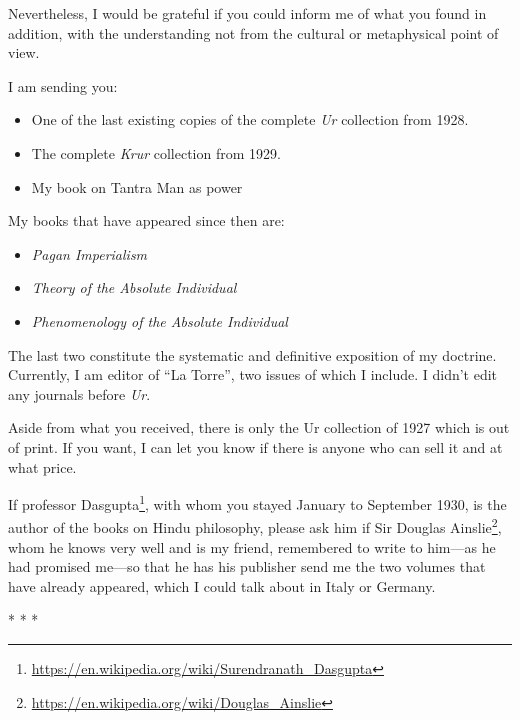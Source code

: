 Nevertheless, I would be grateful if you could inform me of what you found in addition, with the understanding not from the cultural or metaphysical point of view.

I am sending you:

\begin{itemize}
\item One of the last existing copies of the complete \emph{Ur} collection from 1928.
\item The complete \emph{Krur} collection from 1929.
\item My book on Tantra Man as power 
\end{itemize}
My books that have appeared since then are:

\begin{itemize}
\item \emph{Pagan Imperialism}
\item \emph{Theory of the Absolute Individual}
\item \emph{Phenomenology of the Absolute Individual}
\end{itemize}


The last two constitute the systematic and definitive exposition of my doctrine. Currently, I am editor of ``La Torre'', two issues of which I include. I didn't edit any journals before \emph{Ur}.

Aside from what you received, there is only the Ur collection of 1927 which is out of print. If you want, I can let you know if there is anyone who can sell it and at what price.

If professor Dasgupta\footnote{\url{https://en.wikipedia.org/wiki/Surendranath\_Dasgupta}}, with whom you stayed January to September 1930, is the author of the books on Hindu philosophy, please ask him if Sir Douglas Ainslie\footnote{\url{https://en.wikipedia.org/wiki/Douglas\_Ainslie}}, whom he knows very well and is my friend, remembered to write to him---as he had promised me---so that he has his publisher send me the two volumes that have already appeared, which I could talk about in Italy or Germany.


\begin{center}* * *\end{center}

